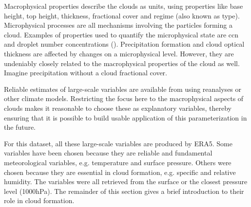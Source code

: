 Macrophysical properties describe the clouds as units, using properties like base height, top height, thickness, fractional cover and regime (also known as type). Microphysical processes are all mechanisms involving the particles forming a cloud. Examples of properties used to quantify the microphysical state
are \acrshort{ccn} and droplet number concentrations (\cite{Grabowski2019ModelingBetter}). Precipitation formation and cloud optical thickness are affected by changes on a microphysical level. However, they are undeniably closely related to the macrophysical properties of the cloud as well. Imagine precipitation without a cloud fractional cover. 

Reliable estimates of large-scale variables are available from using reanalyses or other climate models. Restricting the focus here to the macrophysical aspects of clouds makes it reasonable to choose these as explanatory variables, thereby ensuring that it is possible to build usable application of this parameterization in the future.

For this dataset, all these large-scale variables are produced by ERA5. Some variables have been chosen because they are reliable and fundamental meteorological variables, e.g. temperature and surface pressure. Others were chosen because they are essential in cloud formation, e.g. specific and relative humidity. The variables were all retrieved from the surface or the closest pressure level (1000hPa). The remainder of this section gives a brief introduction to their role in cloud formation. %

